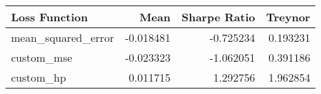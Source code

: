 \begin{tabular}{lrrr}
\toprule
     Loss Function &      Mean &  Sharpe Ratio &  Treynor \\
\midrule
mean\_squared\_error & -0.018481 &     -0.725234 & 0.193231 \\
        custom\_mse & -0.023323 &     -1.062051 & 0.391186 \\
         custom\_hp &  0.011715 &      1.292756 & 1.962854 \\
\bottomrule
\end{tabular}

